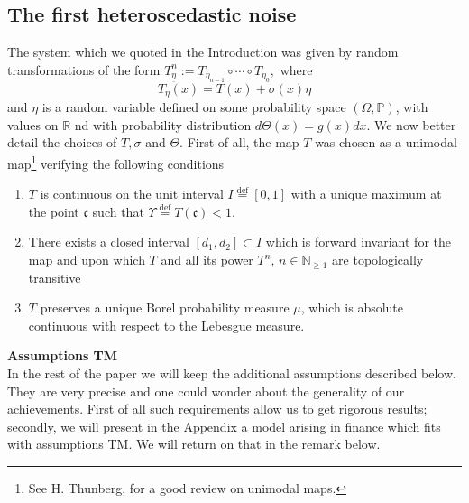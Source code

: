 \documentclass{article}
\newcommand{\etam}{\underline{\eta}}
\newcommand{\1}{\mathbbm{1}}
\begin{document}
\subsection{The first heteroscedastic noise}\label{tre}
 The system which we quoted in the Introduction was given by random transformations of the form $T^n_{\etam}:=T_{\eta_{n-1}}\circ\cdots\circ T_{\eta_0},$ where 
 \begin{equation}\label{rrr}
T_{\eta}(x)=T(x)+\sigma(x)\eta
\end{equation}
 and $\eta$ is a  random variable  defined on some probability space $(\Omega, \mathbb{P})$, with values on $\mathbb{R}$ nd with probability distribution $d\Theta(x)=g(x)dx.$ 
We now  better detail the choices of $T, \sigma$ and $\Theta.$ First of all, the map $T$ was chosen as a unimodal map\footnote{See \cite{thunberg2001periodicity} H. Thunberg, for a good review on unimodal maps.} verifying the following conditions
\begin{enumerate}
    \item $T$ is  continuous on the unit interval $I\overset{\text{def}}{=}[0,1]$ with a unique maximum at the point $\mathfrak{c}$ such that $\Upsilon \overset{\text{def}}{=} T(\mathfrak{c}) < 1$.
    \item  There exists a closed interval $[d_1, d_2] \subset I$ which is forward invariant for the map and upon which $T$ and all its power $T^{n},\,n\in\mathbb{N}_{\geq 1}$ are topologically transitive
    \item   $T$ preserves a unique Borel probability measure $\mu$, which is absolute continuous with respect to the Lebesgue measure. 
  \end{enumerate}  
  {\bf Assumptions TM}\\
  In the rest of the paper we will keep the  additional assumptions described below. They are   very precise and one could wonder about the generality of
our achievements. First of all such requirements allow us to get rigorous results; secondly, we will present
in the Appendix a model arising in finance which fits with assumptions TM. We will return on that in the remark below.\\
\end{document}
